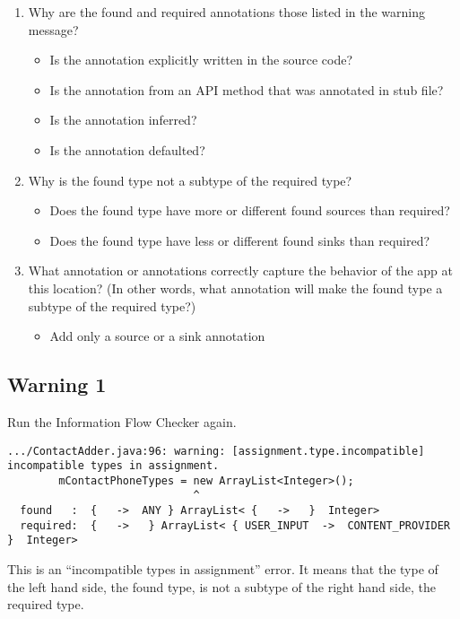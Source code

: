 \begin{enumerate}
\item Why are the found and required annotations those listed in the warning message?
   \begin{itemize}
    \item Is the annotation explicitly written in the source code? 
    \item Is the annotation from an API method that was annotated in stub file? 
    \item Is the annotation inferred? 
    \item Is the annotation defaulted? 
    \end{itemize}
\item Why is the found type not a subtype of the required type? 
  \begin{itemize}
   \item Does the found type have more or different found sources than required?
   \item Does the found type have less or different found sinks than required? 
   \end{itemize}
\item What annotation or annotations correctly capture the behavior of the app at
  this location? (In other words, what annotation will make the found type a 
  subtype of the required type?)
   \begin{itemize}
   \item Add only a source or a sink annotation
   \end{itemize}
\end{enumerate}

\subsection{Warning 1}
Run the Information Flow Checker again.

\begin{Verbatim}  
.../ContactAdder.java:96: warning: [assignment.type.incompatible] incompatible types in assignment.
        mContactPhoneTypes = new ArrayList<Integer>();
                             ^
  found   :  {   ->  ANY } ArrayList< {   ->   }  Integer>
  required:  {   ->   } ArrayList< { USER_INPUT  ->  CONTENT_PROVIDER }  Integer>
\end{Verbatim}
This is an ``incompatible types in assignment'' error.  It means that the type
of the left hand side, the found type, is not a subtype of the right hand side,
the required type.
 
